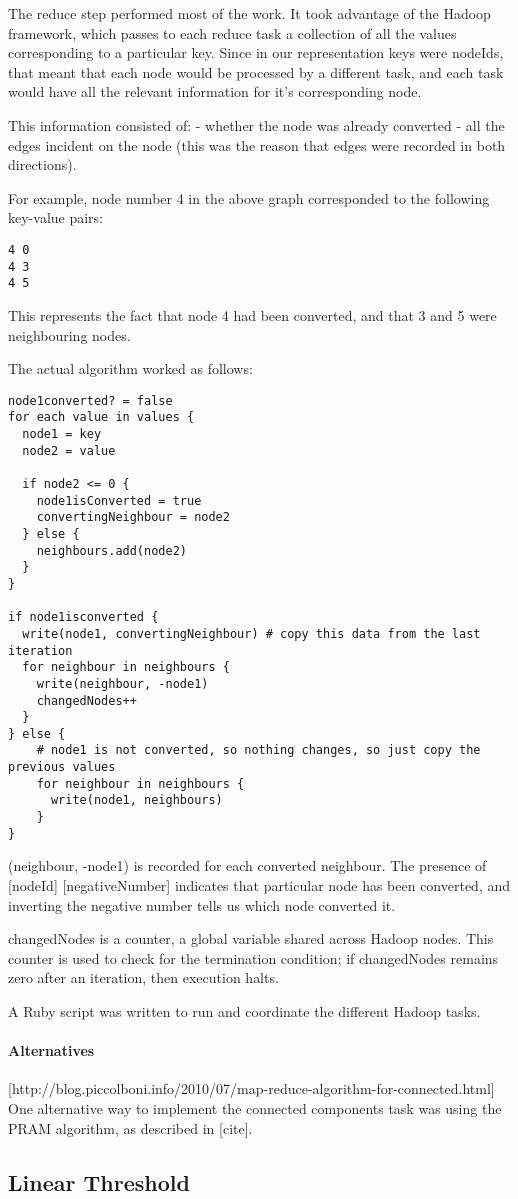 The reduce step performed most of the work. It took advantage of the Hadoop framework, which passes to each reduce task a collection of all the values corresponding to a particular key. Since in our representation keys were nodeIds, that meant that each node would be processed by a different task, and each task would have all the relevant information for it's corresponding node.

This information consisted of:
- whether the node was already converted
- all the edges incident on the node (this was the reason that edges were recorded in both directions).

For example, node number 4 in the above graph corresponded to the following key-value pairs:

\begin{verbatim}
4 0
4 3
4 5
\end{verbatim}

This represents the fact that node 4 had been converted, and that 3 and 5 were neighbouring nodes.

The actual algorithm worked as follows:

\begin{verbatim}
node1converted? = false
for each value in values {
  node1 = key
  node2 = value

  if node2 <= 0 {
    node1isConverted = true
    convertingNeighbour = node2
  } else {
    neighbours.add(node2)
  }
}

if node1isconverted {
  write(node1, convertingNeighbour) # copy this data from the last iteration
  for neighbour in neighbours {
    write(neighbour, -node1)
    changedNodes++
  } 
} else {
    # node1 is not converted, so nothing changes, so just copy the previous values
    for neighbour in neighbours {
      write(node1, neighbours)
    }            
}
\end{verbatim}

(neighbour, -node1) is recorded for each converted neighbour. The presence of [nodeId] [negativeNumber] indicates that particular node has been converted, and inverting the negative number tells us which node converted it.

changedNodes is a counter, a global variable shared across Hadoop nodes. This counter is used to check for the termination condition; if changedNodes remains zero after an iteration, then execution halts.

A Ruby script was written to run and coordinate the different Hadoop tasks.

\paragraph{Alternatives}

[http://blog.piccolboni.info/2010/07/map-reduce-algorithm-for-connected.html] One alternative way to implement the connected components task was using the PRAM algorithm, as described in [cite]. 

\subsection{Linear Threshold}

